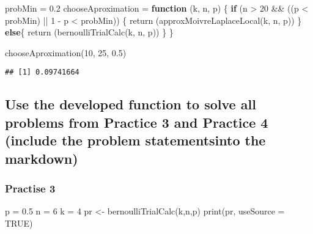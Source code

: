 \documentclass[
]{article}
\newenvironment{Shaded}{\begin{snugshade}}{\end{snugshade}}
\newcommand{\AttributeTok}[1]{\textcolor[rgb]{0.77,0.63,0.00}{#1}}
\newcommand{\ConstantTok}[1]{\textcolor[rgb]{0.00,0.00,0.00}{#1}}
\newcommand{\ControlFlowTok}[1]{\textcolor[rgb]{0.13,0.29,0.53}{\textbf{#1}}}
\newcommand{\DecValTok}[1]{\textcolor[rgb]{0.00,0.00,0.81}{#1}}
\newcommand{\FloatTok}[1]{\textcolor[rgb]{0.00,0.00,0.81}{#1}}
\newcommand{\FunctionTok}[1]{\textcolor[rgb]{0.00,0.00,0.00}{#1}}
\newcommand{\NormalTok}[1]{#1}
\newcommand{\OtherTok}[1]{\textcolor[rgb]{0.56,0.35,0.01}{#1}}
\newcommand{\SpecialCharTok}[1]{\textcolor[rgb]{0.00,0.00,0.00}{#1}}
\begin{document}
\begin{Shaded}
\begin{Highlighting}[]
\NormalTok{probMin }\OtherTok{=} \FloatTok{0.2}
\NormalTok{chooseAproximation }\OtherTok{=} \ControlFlowTok{function}\NormalTok{ (k, n, p)}
\NormalTok{\{}
  \ControlFlowTok{if}\NormalTok{ (n }\SpecialCharTok{\textgreater{}} \DecValTok{20} \SpecialCharTok{\&\&}\NormalTok{ ((p }\SpecialCharTok{\textless{}}\NormalTok{ probMin) }\SpecialCharTok{||} \DecValTok{1} \SpecialCharTok{{-}}\NormalTok{ p }\SpecialCharTok{\textless{}}\NormalTok{ probMin)) \{}
    \FunctionTok{return}\NormalTok{ (}\FunctionTok{approxMoivreLaplaceLocal}\NormalTok{(k, n, p))}
\NormalTok{  \}}
  \ControlFlowTok{else}\NormalTok{\{}
    \FunctionTok{return}\NormalTok{ (}\FunctionTok{bernoulliTrialCalc}\NormalTok{(k, n, p))}
\NormalTok{  \}}
\NormalTok{\}}
\end{Highlighting}
\end{Shaded}

\begin{Shaded}
\begin{Highlighting}[]
\FunctionTok{chooseAproximation}\NormalTok{(}\DecValTok{10}\NormalTok{, }\DecValTok{25}\NormalTok{, }\FloatTok{0.5}\NormalTok{)}
\end{Highlighting}
\end{Shaded}

\begin{verbatim}
## [1] 0.09741664
\end{verbatim}

\hypertarget{use-the-developed-function-to-solve-all-problems-from-practice-3-and-practice-4-include-the-problem-statementsinto-the-markdown}{%
\subsection{Use the developed function to solve all problems from
Practice 3 and Practice 4 (include the problem statementsinto the
markdown)}\label{use-the-developed-function-to-solve-all-problems-from-practice-3-and-practice-4-include-the-problem-statementsinto-the-markdown}}

\hypertarget{practise-3}{%
\subsubsection{Practise 3}\label{practise-3}}

\begin{Shaded}
\begin{Highlighting}[]
\NormalTok{p }\OtherTok{=} \FloatTok{0.5}
\NormalTok{n }\OtherTok{=} \DecValTok{6}
\NormalTok{k }\OtherTok{=} \DecValTok{4}
\NormalTok{pr }\OtherTok{\textless{}{-}} \FunctionTok{bernoulliTrialCalc}\NormalTok{(k,n,p)}
\FunctionTok{print}\NormalTok{(pr, }\AttributeTok{useSource =} \ConstantTok{TRUE}\NormalTok{)}
\end{Highlighting}
\end{Shaded}
\end{document}
